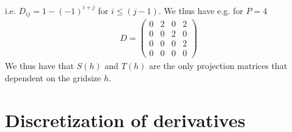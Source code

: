 \documentclass[a4paper,12pt]{scrartcl}
\begin{document}
i.e. $D_{ij} = 1 - (-1)^{i+j}$ for $i\le (j-1)$. We thus have e.g. for $P=4$
\begin{align}
    D = \begin{pmatrix}
        0 & 2 & 0 & 2 \\
        0 & 0 & 2 & 0 \\
        0 & 0 & 0 & 2 \\
        0 & 0 & 0 & 0 
    \end{pmatrix}
    \label{eq:example_derivative}
\end{align}
We thus have that $S(h)$ and $T(h)$ are the only projection matrices that dependent on the gridsize $h$.
















\section{ Discretization of derivatives}
\end{document}
